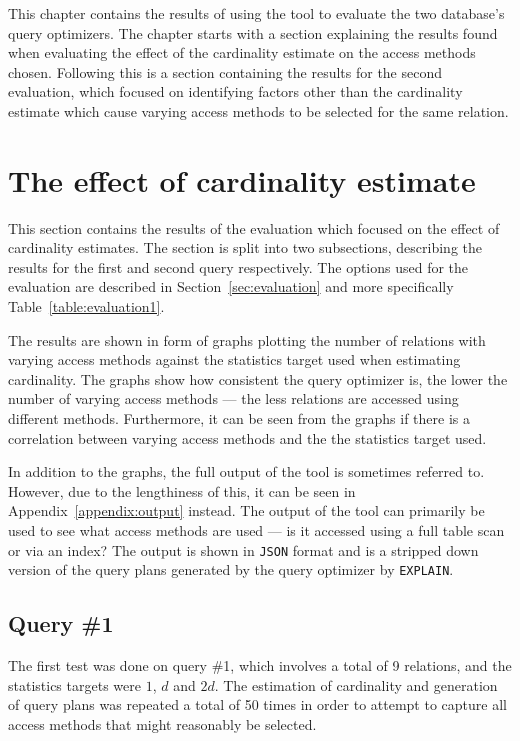 This chapter contains the results of using the tool to evaluate the two
database's query optimizers. The chapter starts with a section explaining the
results found when evaluating the effect of the cardinality estimate on the access
methods chosen. Following this is a section containing the results for the
second evaluation, which focused on identifying factors other than the
cardinality estimate which cause varying access methods to be selected for the
same relation.

\section{The effect of cardinality estimate}\label{sec:correlation}
This section contains the results of the evaluation which focused on the effect of
cardinality estimates. The section is split into two subsections, describing the
results for the first and second query respectively. The options used for the
evaluation are described in Section~\ref{sec:evaluation} and more specifically
Table~\ref{table:evaluation1}.

The results are shown in form of graphs plotting the number of relations with
varying access methods against the statistics target used when estimating
cardinality. The graphs show how consistent the query optimizer is, the lower
the number of varying access methods --- the less relations are accessed using
different methods. Furthermore, it can be seen from the graphs if there is a
correlation between varying access methods and the the statistics target used.

In addition to the graphs, the full output of the tool is sometimes referred to.
However, due to the lengthiness of this, it can be seen in
Appendix~\ref{appendix:output} instead. The output of the tool can primarily be
used to see what access methods are used --- is it accessed using a full table
scan or via an index? The output is shown in \texttt{JSON} format and is a
stripped down version of the query plans generated by the query optimizer by
\texttt{EXPLAIN}.\@

\subsection{Query \#1}
The first test was done on query \#1, which involves a total of 9 relations,
and the statistics targets were $1$, $d$ and $2d$. The estimation of cardinality
and generation of query plans was repeated a total of 50 times in order to
attempt to capture all access methods that might reasonably be selected.

